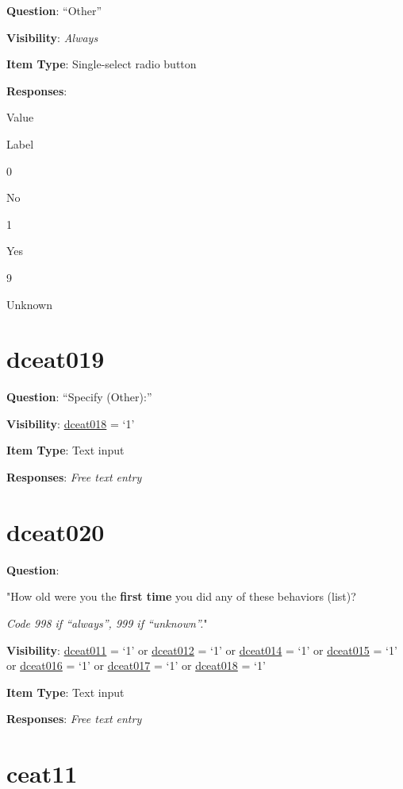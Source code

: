 \documentclass[]{book}
\begin{document}
\textbf{Question}: ``Other''

\textbf{Visibility}: \emph{Always}

\textbf{Item Type}: Single-select radio button

\textbf{Responses}:

Value

Label

0

No

1

Yes

9

Unknown

\hypertarget{dceat019}{%
\section{dceat019}\label{dceat019}}

\textbf{Question}: ``Specify (Other):''

\textbf{Visibility}: \protect\hyperlink{dceat018}{dceat018} = `1'

\textbf{Item Type}: Text input

\textbf{Responses}: \emph{Free text entry}

\hypertarget{dceat020}{%
\section{dceat020}\label{dceat020}}

\textbf{Question}:

"How old were you the \textbf{first time} you did any of these behaviors (list)?

\emph{Code 998 if ``always'', 999 if ``unknown''.}"

\textbf{Visibility}: \protect\hyperlink{dceat011}{dceat011} = `1' or \protect\hyperlink{dceat012}{dceat012} = `1' or \protect\hyperlink{dceat014}{dceat014} = `1' or \protect\hyperlink{dceat015}{dceat015} = `1' or \protect\hyperlink{dceat016}{dceat016} = `1' or \protect\hyperlink{dceat017}{dceat017} = `1' or \protect\hyperlink{dceat018}{dceat018} = `1'

\textbf{Item Type}: Text input

\textbf{Responses}: \emph{Free text entry}

\hypertarget{ceat11}{%
\section{ceat11}\label{ceat11}}
\end{document}
